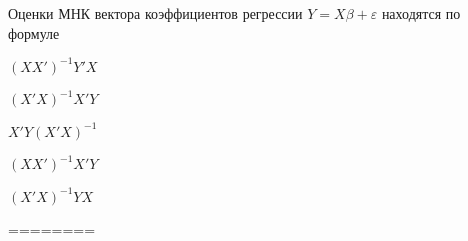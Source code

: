 
\begin{question}
Оценки МНК вектора коэффициентов регрессии \(Y=X\beta + \varepsilon\)
находятся по формуле
\begin{answerlist}
  \item \((XX')^{-1}Y'X\)
  \item \((X'X)^{-1}X'Y\)
  \item \(X'Y(X'X)^{-1}\)
  \item \((XX')^{-1}X'Y\)
  \item \((X'X)^{-1}YX\)
\end{answerlist}
\end{question}

\begin{solution}
========
\end{solution}

